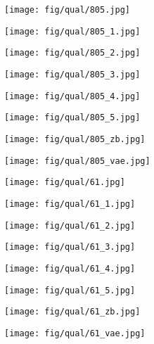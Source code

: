 \documentclass[10pt,twocolumn,letterpaper]{article}
\newcommand{\sz}{0.102}
\newcommand{\szl}{0.067}
\begin{document}
\begin{figure*}[t]
\begin{subfigure}[c]{\sz\linewidth}
\texttt{[image: fig/qual/805.jpg]}
\end{subfigure}
\begin{subfigure}[c]{\sz\linewidth}
\texttt{[image: fig/qual/805\_1.jpg]}
\end{subfigure}
\begin{subfigure}[c]{\sz\linewidth}
\texttt{[image: fig/qual/805\_2.jpg]}
\end{subfigure}
\begin{subfigure}[c]{\sz\linewidth}
\texttt{[image: fig/qual/805\_3.jpg]}
\end{subfigure}
\begin{subfigure}[c]{\sz\linewidth}
\texttt{[image: fig/qual/805\_4.jpg]}
\end{subfigure}
\hspace{3pt}
\begin{subfigure}[c]{\sz\linewidth}
\texttt{[image: fig/qual/805\_5.jpg]}
\end{subfigure}
\begin{subfigure}[c]{\szl\linewidth}
\texttt{[image: fig/qual/805\_zb.jpg]}
\end{subfigure}
\hspace{3pt}
\begin{subfigure}[c]{\szl\linewidth}
\texttt{[image: fig/qual/805\_vae.jpg]}
\end{subfigure}

\begin{subfigure}[c]{\sz\linewidth}
\texttt{[image: fig/qual/61.jpg]}
\end{subfigure}
\begin{subfigure}[c]{\sz\linewidth}
\texttt{[image: fig/qual/61\_1.jpg]}
\end{subfigure}
\begin{subfigure}[c]{\sz\linewidth}
\texttt{[image: fig/qual/61\_2.jpg]}
\end{subfigure}
\begin{subfigure}[c]{\sz\linewidth}
\texttt{[image: fig/qual/61\_3.jpg]}
\end{subfigure}
\begin{subfigure}[c]{\sz\linewidth}
\texttt{[image: fig/qual/61\_4.jpg]}
\end{subfigure}
\hspace{3pt}
\begin{subfigure}[c]{\sz\linewidth}
\texttt{[image: fig/qual/61\_5.jpg]}
\end{subfigure}
\begin{subfigure}[c]{\szl\linewidth}
\texttt{[image: fig/qual/61\_zb.jpg]}
\end{subfigure}
\hspace{3pt}
\begin{subfigure}[c]{\szl\linewidth}
\texttt{[image: fig/qual/61\_vae.jpg]}
\end{subfigure}


\end{figure*}
\end{document}
